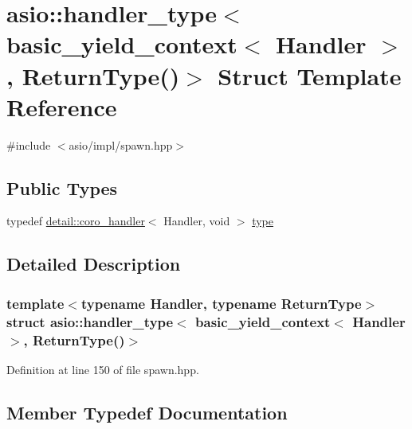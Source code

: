 \hypertarget{structasio_1_1handler__type_3_01basic__yield__context_3_01_handler_01_4_00_01_return_type_07_08_4}{}\section{asio\+:\+:handler\+\_\+type$<$ basic\+\_\+yield\+\_\+context$<$ Handler $>$, Return\+Type()$>$ Struct Template Reference}
\label{structasio_1_1handler__type_3_01basic__yield__context_3_01_handler_01_4_00_01_return_type_07_08_4}


{\ttfamily \#include $<$asio/impl/spawn.\+hpp$>$}

\subsection*{Public Types}
\begin{DoxyCompactItemize}
\item 
typedef \hyperlink{classasio_1_1detail_1_1coro__handler}{detail\+::coro\+\_\+handler}$<$ Handler, void $>$ \hyperlink{structasio_1_1handler__type_3_01basic__yield__context_3_01_handler_01_4_00_01_return_type_07_08_4_a95cc39df11262f252961b7f1a4e1586a}{type}
\end{DoxyCompactItemize}


\subsection{Detailed Description}
\subsubsection*{template$<$typename Handler, typename Return\+Type$>$struct asio\+::handler\+\_\+type$<$ basic\+\_\+yield\+\_\+context$<$ Handler $>$, Return\+Type()$>$}



Definition at line 150 of file spawn.\+hpp.



\subsection{Member Typedef Documentation}
\hypertarget{structasio_1_1handler__type_3_01basic__yield__context_3_01_handler_01_4_00_01_return_type_07_08_4_a95cc39df11262f252961b7f1a4e1586a}{}
